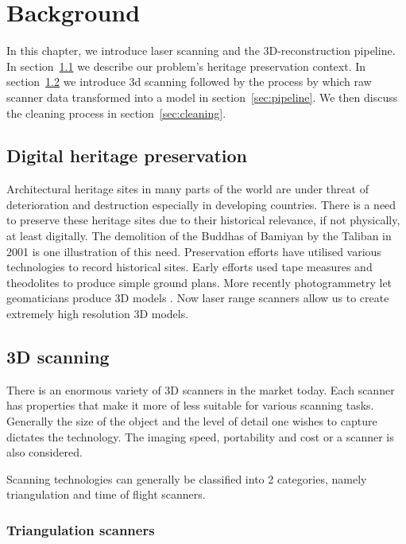 \chapter{Background} \label{ch:background}

In this chapter, we introduce laser scanning and the 3D-reconstruction pipeline. In section~\ref{sec:heritage} we describe our problem's heritage preservation context. In section~\ref{sec:scanners} we introduce 3d scanning followed by the process by which raw scanner data transformed into a model in section~\ref{sec:pipeline}. We then discuss the cleaning process in section~\ref{sec:cleaning}.




\section{Digital heritage preservation} \label{sec:heritage}

Architectural heritage sites in many parts of the world are under threat of deterioration and destruction especially in developing countries. There is a need to preserve these heritage sites due to their historical relevance, if not physically, at least digitally. The demolition of  the Buddhas of Bamiyan by the Taliban in 2001 \cite{Toubekis2009} is one illustration of this need. Preservation efforts have utilised various technologies to record historical sites. Early efforts used tape measures and theodolites to produce simple ground plans. More recently photogrammetry let geomaticians produce 3D models \cite{Heritage}. Now laser range scanners allow us to create extremely high resolution 3D models.


\section{3D scanning} \label{sec:scanners}

There is an enormous variety of 3D scanners in the market today. Each scanner has properties that make it more of less suitable for various scanning tasks. Generally the size of the object and the level of detail one wishes to capture dictates the technology. The imaging speed, portability and cost or a scanner is also considered.

Scanning technologies can generally be classified into 2 categories, namely triangulation and time of flight scanners.

\subsection{Triangulation scanners}

